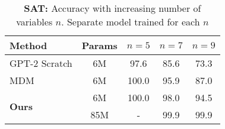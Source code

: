 \begin{table}[htbp]
\centering
\caption{\textbf{SAT:} Accuracy with increasing number of variables $n$. Separate model trained for each $n$}
\begin{tabular}{lcccc}
\toprule
Method                               & Params & $n=5$  & $n=7$  & $n=9$  \\
\midrule
GPT-2 Scratch                        & 6M     & 97.6   & 85.6   & 73.3   \\
MDM                                  & 6M     & 100.0  & 95.9   & 87.0   \\
\hline
\multirow{2}{*}{\textbf{Ours}}       & 6M     & 100.0  & 98.0   & 94.5   \\
                                     & 85M    & -      & 99.9   & 99.9   \\
\bottomrule
\end{tabular}
\label{tab:sat_n_5_7_9_accuracy}
\end{table}